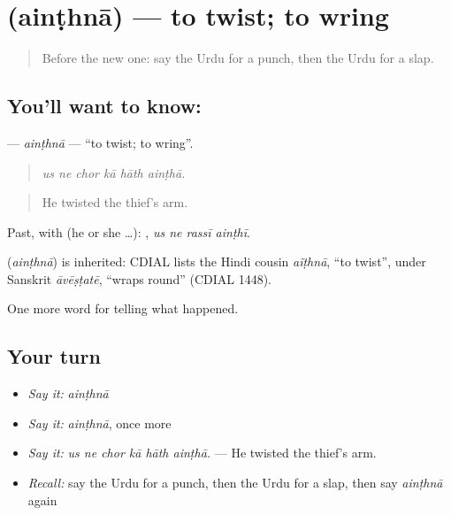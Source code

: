 \section[\texorpdfstring{\ur{اینٹھنا} (ainṭhnā)}{اینٹھنا (ainṭhnā)}]{ (ainṭhnā) — to twist; to wring}

\label{lesson:UR-C307-ainthna}



\begin{quote}
Before the new one: say the Urdu for a punch, then the Urdu for a slap.
\end{quote}

\subsection*{You'll want to know: }
\textbf{} — \emph{ainṭhnā} — \textquotedblleft{}to twist; to wring\textquotedblright{}.

\begin{quote}
     
\end{quote}

\begin{quote}
\emph{us ne chor kā hāth ainṭhā.}
\end{quote}

\begin{quote}
He twisted the thief's arm.
\end{quote}

Past, with  (he or she …):    , \emph{us ne rassī ainṭhī}.

\begin{cousinweb}
\textbf{} (\emph{ainṭhnā}) is inherited: CDIAL lists the Hindi cousin \emph{aĩṭhnā}, \textquotedblleft{}to twist\textquotedblright{}, under Sanskrit \emph{āvēṣṭatē}, \textquotedblleft{}wraps round\textquotedblright{} (CDIAL 1448).
\end{cousinweb}

\begin{grammarlens}[title={What you've built}]
One more word for telling what happened.
\end{grammarlens}

\subsection*{Your turn}
\begin{itemize}
\raggedright
  \item \emph{Say it:} \emph{ainṭhnā}
  \item \emph{Say it:} \emph{ainṭhnā}, once more
  \item \emph{Say it:} \emph{us ne chor kā hāth ainṭhā.} — He twisted the thief's arm.
  \item \emph{Recall:} say the Urdu for a punch, then the Urdu for a slap, then say \emph{ainṭhnā} again
\end{itemize}


